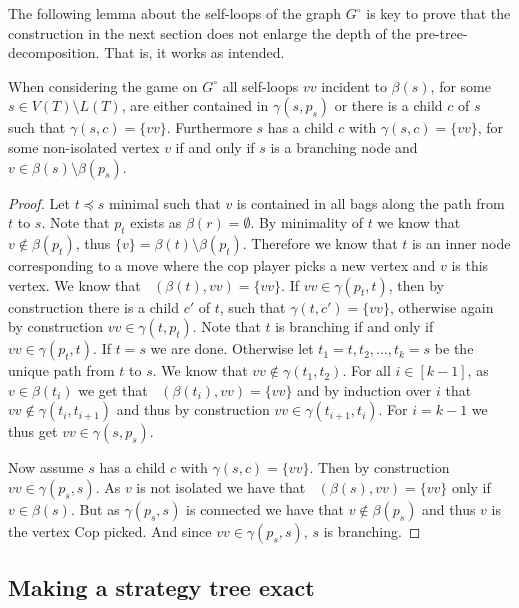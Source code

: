 \documentclass{lmcs}
\theoremstyle{plain}\newtheorem{claim}[thm]{Claim}   %
\DeclareMathOperator{\escapeE}{comp_E}
\newcommand{\preTreeDec}{pre-tree-decomposition}
\begin{document}
The following lemma about the self-loops of the graph $G^\circ$ is key to prove that the construction in the next section does not enlarge the depth of the \preTreeDec.
That is, it works as intended.

\begin{lem}
	\label{obs:self-loops-gamma}
	\label{obs:self-loops}
	When considering the game on $G^\circ$ all self-loops $vv$ incident to $\beta(s)$, for some $s\in V(T)\setminus L(T)$, are either contained in $\gamma(s,p_s)$ or there is a child $c$ of $s$ such that $\gamma(s,c)=\{vv\}$.
	Furthermore $s$ has a child $c$ with $\gamma(s,c)=\{vv\}$, for some non-isolated vertex $v$ if and only if $s$ is a branching node and $v\in\beta(s)\setminus\beta(p_s)$.
\end{lem}

\begin{proof}
	Let $t\preceq s$ minimal such that $v$ is contained in all bags along the path from $t$ to $s$.
	Note that $p_t$ exists as $\beta(r)=\emptyset$.
	By minimality of $t$ we know that $v\notin \beta(p_t)$, thus $\{v\}=\beta(t)\setminus\beta(p_t)$.
	Therefore we know that $t$ is an inner node corresponding to a move where the cop player picks a new vertex and $v$ is this vertex.
	We know that $\escapeE(\beta(t),vv)=\{vv\}$.
	If $vv\in\gamma(p_t,t)$, then by construction there is a child $c'$ of $t$, such that $\gamma(t,c')=\{vv\}$, otherwise again by construction $vv\in \gamma(t,p_t)$.
	Note that $t$ is branching if and only if $vv\in\gamma(p_t,t)$.
	If $t=s$ we are done.
	Otherwise let $t_1=t,t_2,\ldots,t_k=s$ be the unique path from $t$ to $s$.
	We know that $vv\notin\gamma(t_1,t_2)$.
	For all $i\in [k-1]$, as $v\in \beta(t_i)$ we get that $\escapeE(\beta(t_i),vv)=\{vv\}$ and by induction over $i$ that $vv\notin \gamma(t_i,t_{i+1})$ and thus by construction $vv\in\gamma(t_{i+1},t_i)$.
	For $i=k-1$ we thus get $vv\in\gamma(s,p_s)$.
	
	Now assume $s$ has a child $c$ with $\gamma(s,c)=\{vv\}$.
	Then by construction $vv\in \gamma(p_s,s)$.
	As $v$ is not isolated we have that $\escapeE(\beta(s),vv)=\{vv\}$ only if $v\in\beta(s)$.
	But as $\gamma(p_s,s)$ is connected we have that $v\notin \beta(p_s)$ and thus $v$ is the vertex Cop picked.
	And since $vv\in \gamma(p_s,s)$, $s$ is branching.
\end{proof}

\subsection{Making a strategy tree exact}\label{sec:make-exact}
\end{document}
